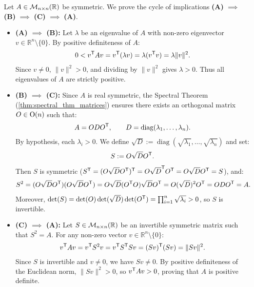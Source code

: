 \begin{exercisesolution}
\label{sol:positive_definite_equivalent_characterizations}
Let $A \in \mathcal{M}_{n \times n}(\mathbb{R})$ be symmetric. We prove the cycle of implications \textbf{(A)} $\implies$ \textbf{(B)} $\implies$ \textbf{(C)} $\implies$ \textbf{(A)}.
\begin{itemize}
    \item \textbf{(A) $\implies$ (B):}
    Let $\lambda$ be an eigenvalue of $A$ with non-zero eigenvector $v \in \mathbb{R}^n \setminus \{0\}$.
    By positive definiteness of $A$:
    \[
    0 < v^{\mathsf{T}} A v = v^{\mathsf{T}} (\lambda v) = \lambda (v^{\mathsf{T}} v) = \lambda \|v\|^2.
    \]
    Since $v \ne 0$, $\|v\|^2 > 0$, and dividing by $\|v\|^2$ gives $\lambda > 0$.
    Thus all eigenvalues of $A$ are strictly positive.

    \item \textbf{(B) $\implies$ (C):}
    Since $A$ is real symmetric, the Spectral Theorem (\cref{thm:spectral_thm_matrices}) ensures there exists an orthogonal matrix $O \in \operatorname{O}(n)$ such that:
    \[
    A = O D O^{\mathsf{T}}, \qquad D = \operatorname{diag}(\lambda_1, \dots, \lambda_n).
    \]
    By hypothesis, each $\lambda_i > 0$. We define $\sqrt{D} := \operatorname{diag}(\sqrt{\lambda_1}, \dots, \sqrt{\lambda_n})$ and set:
    \[
    S := O \sqrt{D} O^{\mathsf{T}}.
    \]
    Then $S$ is symmetric ($S^{\mathsf{T}} = (O \sqrt{D} O^{\mathsf{T}})^{\mathsf{T}} = O \sqrt{D}^{\mathsf{T}} O^{\mathsf{T}} = O \sqrt{D} O^{\mathsf{T}} = S$), and:
    \[
    S^2 = (O \sqrt{D} O^{\mathsf{T}})(O \sqrt{D} O^{\mathsf{T}}) = O \sqrt{D} (O^{\mathsf{T}} O) \sqrt{D} O^{\mathsf{T}} = O (\sqrt{D})^2 O^{\mathsf{T}} = O D O^{\mathsf{T}} = A.
    \]
    Moreover, $\det(S) = \det(O)\det(\sqrt{D})\det(O^{\mathsf{T}}) = \prod_{i=1}^n \sqrt{\lambda_i} > 0$, so $S$ is invertible.

    \item \textbf{(C) $\implies$ (A):}
    Let $S \in \mathcal{M}_{n \times n}(\mathbb{R})$ be an invertible symmetric matrix such that $S^2 = A$.
    For any non-zero vector $v \in \mathbb{R}^n \setminus \{0\}$:
    \[
    v^{\mathsf{T}} A v = v^{\mathsf{T}} S^2 v = v^{\mathsf{T}} S^{\mathsf{T}} S v = (Sv)^{\mathsf{T}} (Sv) = \|Sv\|^2.
    \]
    Since $S$ is invertible and $v \ne 0$, we have $Sv \ne 0$.
    By positive definiteness of the Euclidean norm, $\|Sv\|^2 > 0$, so $v^{\mathsf{T}} A v > 0$, proving that $A$ is positive definite. \qedhere
\end{itemize}
\end{exercisesolution}
